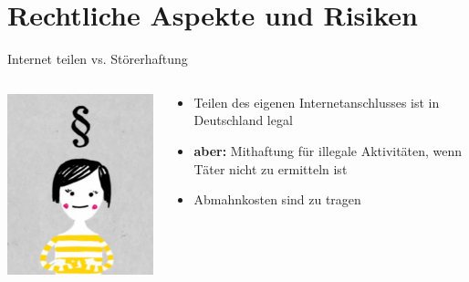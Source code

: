 \documentclass[10pt]{beamer}
\begin{document}
\section{Rechtliche Aspekte und Risiken}

\begin{frame}{Internet teilen vs. Störerhaftung}
	
	\begin{columns}[c]
		\begin{column}{4cm}
			\includegraphics[width=\textwidth]{images/recht}
		\end{column}
		\begin{column}{8cm}
	\begin{itemize}
		\item Teilen des eigenen Internetanschlusses ist in Deutschland legal
		\pause\item \textbf{aber:} Mithaftung für illegale Aktivitäten, wenn Täter nicht zu ermitteln ist
		\pause\item Abmahnkosten sind zu tragen
	\end{itemize}
	

\end{column}
\end{columns}
\end{frame}
\end{document}
